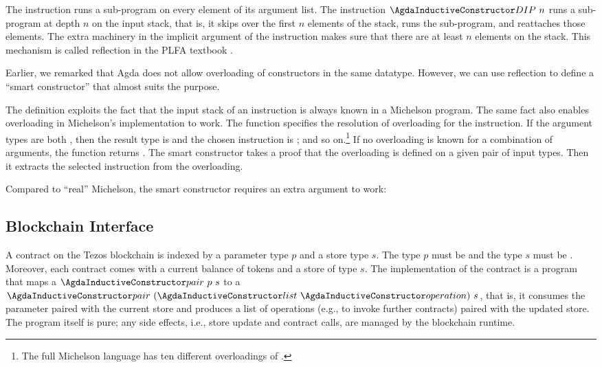 The instruction  runs a sub-program on every element of its
argument list. The instruction $\ACon{DIP}~n$ runs a sub-program at
depth $n$ on the input stack, that is, it skips over the first $n$
elements of the stack, runs the sub-program, and reattaches those
elements. The extra machinery in the implicit argument of the
instruction makes sure that there are at least $n$ elements on the
stack. This mechanism is called reflection in the  PLFA textbook
\cite{plfa}.

Earlier, we remarked that Agda does not allow overloading of
constructors in the same datatype. However, we can use reflection to
define a ``smart constructor'' that almost suits the purpose.
\SyntaxOverloading

The definition exploits the fact that the input stack of an
instruction is always known in a Michelson program. The same fact also
enables overloading in Michelson's implementation to work.
The function  specifies the resolution of overloading
for the  instruction. If the argument types are both
, then the result type is  and the chosen instruction is
; and so on.\footnote{The full Michelson language has ten different
  overloadings of .} If no  overloading is known for a combination
of arguments, the function returns .
The smart constructor  takes a proof that the overloading is
defined on a given pair of input types. Then it extracts the selected
instruction from the overloading.

Compared to ``real'' Michelson, the smart constructor requires an
extra argument to work:
\SyntaxOverloadingExample

\subsection{Blockchain Interface}
\label{sec:blockchain-interface}

A contract on the Tezos blockchain is indexed by a parameter type $p$
and a store type $s$. The type $p$ must be {\APassable} and the type
$s$ must be {\AStorable}. Moreover, each contract comes with a current
balance of tokens and a store of type $s$. The implementation of the
contract is a program that maps a $\ACon{pair}~p~s$ to a
$\ACon{pair}~(\ACon{list}~\Aoperation)~s$, that is, it consumes the
parameter paired with the current store and produces a list of operations (e.g., to invoke further
contracts) paired with the updated store. The program itself is pure;
any side effects, i.e., store update and contract calls, are managed
by the blockchain runtime.
\ConcreteContract

